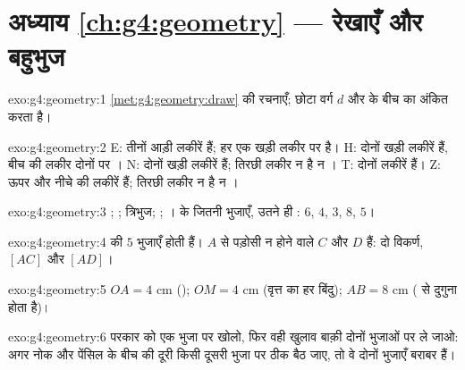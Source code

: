 \section*{अध्याय \ref{ch:g4:geometry} --- रेखाएँ और बहुभुज}

\begin{solution}{exo:g4:geometry:1}
\cref{met:g4:geometry:draw} की रचनाएँ; छोटा वर्ग $d$ और  के
बीच का  अंकित करता है।
\end{solution}

\begin{solution}{exo:g4:geometry:2}
E: तीनों आड़ी लकीरें  हैं; हर एक खड़ी लकीर पर  है।
H: दोनों खड़ी लकीरें  हैं, बीच की लकीर दोनों पर ।
N: दोनों खड़ी लकीरें  हैं; तिरछी लकीर न  है न ।
T: दोनों लकीरें  हैं। Z: ऊपर और नीचे की लकीरें  हैं;
तिरछी लकीर न  है न ।
\end{solution}

\begin{solution}{exo:g4:geometry:3}
; ; त्रिभुज; ; ।  के जितनी
भुजाएँ, उतने ही : $6$, $4$, $3$, $8$, $5$।
\end{solution}

\begin{solution}{exo:g4:geometry:4}
 की $5$ भुजाएँ होती हैं। $A$ से पड़ोसी न होने वाले 
$C$ और $D$ हैं: दो विकर्ण, $[AC]$ और $[AD]$।
\end{solution}

\begin{solution}{exo:g4:geometry:5}
$OA = 4$ cm (); $OM = 4$ cm (वृत्त का हर बिंदु);
$AB = 8$ cm (  से दुगुना होता है)।
\end{solution}

\begin{solution}{exo:g4:geometry:6}
परकार को एक भुजा पर खोलो, फिर वही खुलाव बाक़ी दोनों भुजाओं पर ले
जाओ: अगर नोक और पेंसिल के बीच की दूरी किसी दूसरी भुजा पर ठीक बैठ
जाए, तो वे दोनों भुजाएँ बराबर हैं।
\end{solution}

